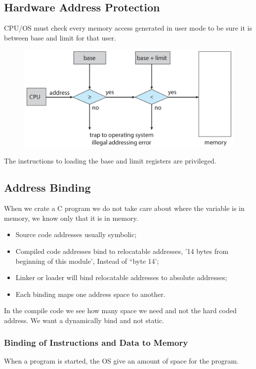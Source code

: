 \newpage
\subsection{Hardware Address Protection}
CPU/OS must check every memory access generated in user mode to
be sure it is between base and limit for that user.

\begin{figure}[htbp]
    \centering
    \includegraphics[width=0.6\linewidth]{img/ikadsuhc.png}
\end{figure}

The instructions to loading the base and limit registers are privileged.

\subsection{Address Binding}
When we crate a C program we do not take care about where the variable is in memory, we know only that it is in memory.

\begin{itemize}
    \item Source code addresses usually symbolic;
    \item Compiled code addresses bind to relocatable addresses, '14 bytes from beginning of this module', Instead of “byte 14';
    \item Linker or loader will bind relocatable addresses to absolute addresses;
    \item Each binding maps one address space to another.
\end{itemize}

In the compile code we see how many space we need and not the hard coded address. We want a dynamically bind and not static.

\newpage
\subsubsection{Binding of Instructions and Data to Memory}

When a program is started, the OS give an amount of space for the program. 


